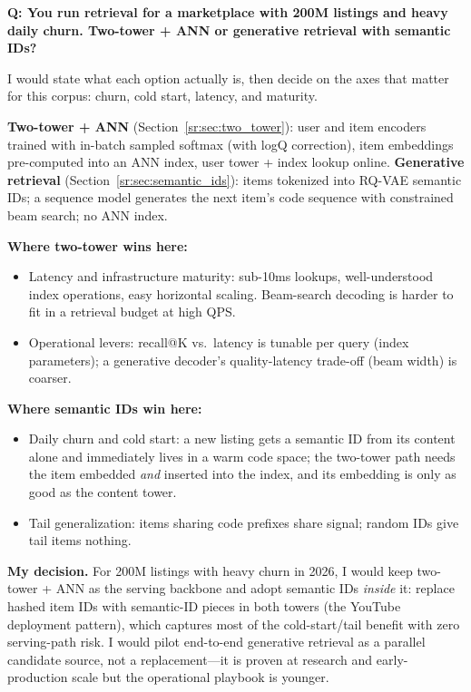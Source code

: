 \begin{interviewq}
\textbf{Q: You run retrieval for a marketplace with 200M listings and heavy daily churn. Two-tower + ANN or generative retrieval with semantic IDs?}

 \quad {} \quad \badgefreq{\freqmed}

\stronganswer

I would state what each option actually is, then decide on the axes that matter for this corpus: churn, cold start, latency, and maturity.

\textbf{Two-tower + ANN} (Section~\ref{sr:sec:two_tower}): user and item encoders trained with in-batch sampled softmax (with logQ correction), item embeddings pre-computed into an ANN index, user tower + index lookup online. \textbf{Generative retrieval} (Section~\ref{sr:sec:semantic_ids}): items tokenized into RQ-VAE semantic IDs; a sequence model generates the next item's code sequence with constrained beam search; no ANN index.

\textbf{Where two-tower wins here:}
\begin{itemize}
    \item Latency and infrastructure maturity: sub-10ms lookups, well-understood index operations, easy horizontal scaling. Beam-search decoding is harder to fit in a retrieval budget at high QPS.
    \item Operational levers: recall@K vs.\ latency is tunable per query (index parameters); a generative decoder's quality-latency trade-off (beam width) is coarser.
\end{itemize}

\textbf{Where semantic IDs win here:}
\begin{itemize}
    \item Daily churn and cold start: a new listing gets a semantic ID from its content alone and immediately lives in a warm code space; the two-tower path needs the item embedded \textit{and} inserted into the index, and its embedding is only as good as the content tower.
    \item Tail generalization: items sharing code prefixes share signal; random IDs give tail items nothing.
\end{itemize}

\textbf{My decision.} For 200M listings with heavy churn in 2026, I would keep two-tower + ANN as the serving backbone and adopt semantic IDs \textit{inside} it: replace hashed item IDs with semantic-ID pieces in both towers (the YouTube deployment pattern), which captures most of the cold-start/tail benefit with zero serving-path risk. I would pilot end-to-end generative retrieval as a parallel candidate source, not a replacement---it is proven at research and early-production scale but the operational playbook is younger.


\end{interviewq}
